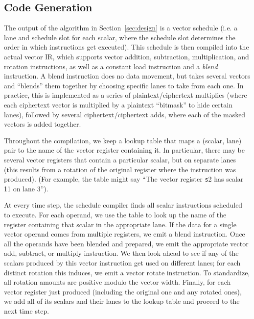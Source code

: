 


\subsection{Code Generation}\label{sec:codegen}
The output of the algorithm in Section~\ref{sec:design} is a vector schedule (i.e. a lane and schedule slot for each scalar, where the schedule slot determines the order in which instructions get executed).
This schedule is then compiled into the actual vector IR, which supports vector addition, subtraction, multiplication, and rotation instructions, as well as a constant load instruction and a {\em blend} instruction.
A blend instruction does no data movement, but takes several vectors and ``blends'' them together by choosing specific lanes to take from each one.
In practice, this is implemented as a series of plaintext/ciphertext multiplies (where each ciphertext vector is multiplied by a plaintext ``bitmask'' to hide certain lanes), followed by several ciphertext/ciphertext adds, where each of the masked vectors is added together.

Throughout the compilation, we keep a lookup table that maps a (scalar, lane) pair to the name of the vector register containing it.
In particular, there may be several vector registers that contain a particular scalar, but on separate lanes (this results from a rotation of the original register where the instruction was produced).
(For example, the table might say ``The vector register {\texttt s2} has scalar 11 on lane 3'').

At every time step, the schedule compiler finds all scalar instructions scheduled to execute.
For each operand, we use the table to look up the name of the register containing that scalar in the appropriate lane.
If the data for a single vector operand comes from multiple registers, we emit a blend instruction.
Once all the operands have been blended and prepared, we emit the appropriate vector add, subtract, or multiply instruction.
We then look ahead to see if any of the scalars produced by this vector instruction get used on different lanes; for each distinct rotation this induces, we emit a vector rotate instruction.
To standardize, all rotation amounts are positive modulo the vector width.
Finally, for each vector register just produced (including the original one and any rotated ones), we add all of its scalars and their lanes to the lookup table and proceed to the next time step.

